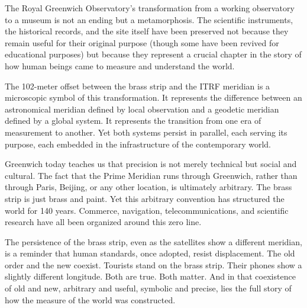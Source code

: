 The Royal Greenwich Observatory's transformation from a working observatory to a museum is not an ending but a metamorphosis. The scientific instruments, the historical records, and the site itself have been preserved not because they remain useful for their original purpose (though some have been revived for educational purposes) but because they represent a crucial chapter in the story of how human beings came to measure and understand the world.

The 102-meter offset between the brass strip and the \textsc{ITRF} meridian is a microscopic symbol of this transformation. It represents the difference between an astronomical meridian defined by local observation and a geodetic meridian defined by a global system. It represents the transition from one era of measurement to another. Yet both systems persist in parallel, each serving its purpose, each embedded in the infrastructure of the contemporary world.

Greenwich today teaches us that precision is not merely technical but social and cultural. The fact that the Prime Meridian runs through Greenwich, rather than through Paris, Beijing, or any other location, is ultimately arbitrary. The brass strip is just brass and paint. Yet this arbitrary convention has structured the world for 140 years. Commerce, navigation, telecommunications, and scientific research have all been organized around this zero line.

The persistence of the brass strip, even as the satellites show a different meridian, is a reminder that human standards, once adopted, resist displacement. The old order and the new coexist. Tourists stand on the brass strip. Their phones show a slightly different longitude. Both are true. Both matter. And in that coexistence of old and new, arbitrary and useful, symbolic and precise, lies the full story of how the measure of the world was constructed.
